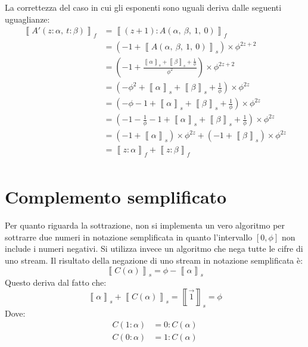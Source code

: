 \documentclass[Lau]{sapthesis}
\begin{document}
La correttezza del caso in cui gli esponenti sono uguali deriva dalle seguenti uguaglianze:
\begin{align*}
\left\llbracket A'(z:\alpha, \ t:\beta) \right\rrbracket_f & = \left\llbracket (z+1):A(\alpha, \ \beta, \ 1, \ 0) \right\rrbracket_f\\
& = \left( -1 + \left\llbracket A(\alpha, \ \beta, \ 1, \ 0) \right\rrbracket_s \right) \times \phi^{2z+2}\\
& = \left( -1 + \frac{ \left\llbracket \alpha \right\rrbracket_s + \left\llbracket \beta \right\rrbracket_s + \frac{1}{\phi}}{\phi^2} \right) \times \phi^{2z+2}\\
& = \left( -\phi^2 + \left\llbracket \alpha \right\rrbracket_s + \left\llbracket \beta \right\rrbracket_s + \frac{1}{\phi} \right) \times \phi^{2z}\\
& = \left( -\phi -1 + \left\llbracket \alpha \right\rrbracket_s + \left\llbracket \beta \right\rrbracket_s + \frac{1}{\phi} \right) \times \phi^{2z}\\
& = \left( -1 -\frac{1}{\phi} -1 + \left\llbracket \alpha \right\rrbracket_s + \left\llbracket \beta \right\rrbracket_s + \frac{1}{\phi} \right) \times \phi^{2z}\\
& = \left( -1 + \left\llbracket \alpha \right\rrbracket_s \right) \times \phi^{2z} + \left( -1 + \left\llbracket \beta \right\rrbracket_s \right) \times \phi^{2z}\\
& = \left\llbracket z:\alpha \right\rrbracket_f + \left\llbracket z:\beta \right\rrbracket_f\\
\end{align*}


\section{Complemento semplificato}
Per quanto riguarda la sottrazione, non si implementa un vero algoritmo per sottrarre due numeri in notazione semplificata in quanto l'intervallo $\left[0,\phi\right]$ non include i numeri negativi. Si utilizza invece un algoritmo che nega tutte le cifre di uno stream. Il risultato della negazione di uno stream in notazione semplificata è:
$$\left\llbracket C(\alpha) \right\rrbracket_s = \phi - \left\llbracket \alpha \right\rrbracket_s$$
Questo deriva dal fatto che:
$$\left\llbracket \alpha \right\rrbracket_s + \left\llbracket C(\alpha) \right\rrbracket_s = \left\llbracket \overrightarrow{1} \right\rrbracket_s = \phi$$
Dove:
\begin{align*}
C(1:\alpha) & = 0:C(\alpha)\\
C(0:\alpha) & = 1:C(\alpha)\\
\end{align*}
\end{document}
